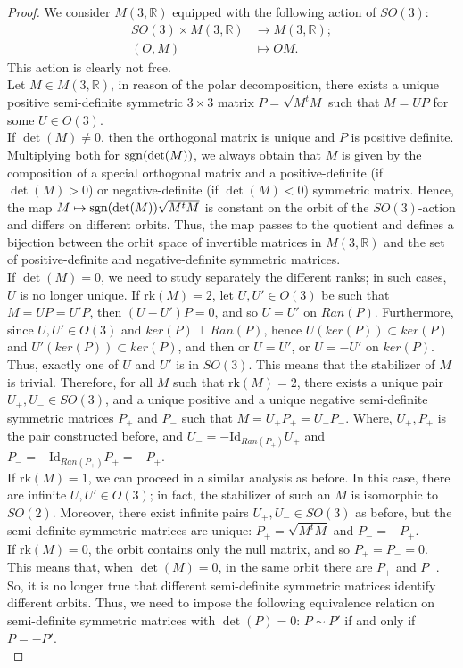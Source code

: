 \documentclass{article}
\numberwithin{equation}{section}
\theoremstyle{definition}
\newcommand{\R}{\mathbb{R}}
\begin{document}
\begin{proof}
    We consider $M(3,\R)$ equipped with the following action of $SO(3)$:
    \begin{align*}
        SO(3)\times M(3,\R)&\to M(3,\R);\\
        (O,M)&\mapsto OM.
    \end{align*}
    This action is clearly not free.\\
    Let $M\in M(3,\R)$, in reason of the polar decomposition, there exists a unique positive semi-definite symmetric $3\times 3$ matrix $P=\sqrt{M^tM}$ such that $M=UP$ for some $U\in O(3)$.\\
    If $\det(M)\neq 0$, then the orthogonal matrix is unique and $P$ is positive definite. Multiplying both for ${\rm sgn}(\det(M))$, we always obtain that $M$ is given by the composition of a special orthogonal matrix and a positive-definite (if $\det(M)>0$) or negative-definite (if $\det(M)<0$) symmetric matrix. Hence, the map $M\mapsto {\rm sgn}(\det(M))\sqrt{M^tM}$ is constant on the orbit of the $SO(3)$-action and differs on different orbits. Thus, the map passes to the quotient and defines a bijection between the orbit space of invertible matrices in $M(3,\R)$ and the set of positive-definite and negative-definite symmetric matrices.\\
    If $\det(M)=0$, we need to study separately the different ranks; in such cases, $U$ is no longer unique. If $\mathrm{rk}(M)=2$, let $U,U'\in O(3)$ be such that $M=UP=U'P$, then $(U-U')P=0$, and so $U=U'$ on $Ran(P)$. Furthermore, since $U,U'\in O(3)$ and $ker(P)\perp Ran(P)$, hence $U(ker(P))\subset ker(P)$ and $U'(ker(P))\subset ker(P)$, and then or $U= U'$, or $U=-U'$ on $ker(P)$. Thus, exactly one of $U$ and $U'$ is in $SO(3)$. This means that the stabilizer of $M$ is trivial. Therefore, for all $M$ such that $\mathrm{rk}(M)=2$, there exists a unique pair $U_+,U_-\in SO(3)$, and a unique positive and a unique negative semi-definite symmetric matrices $P_+$ and $P_-$ such that $M=U_+P_+=U_-P_-$. Where, $U_+,P_+$ is the pair constructed before, and $U_-=-\mathrm{Id}_{Ran(P_+)}U_+$ and $P_-=-\mathrm{Id}_{Ran(P_+)}P_+=-P_+$.\\
    If $\mathrm{rk}(M)=1$, we can proceed in a similar analysis as before. In this case, there are infinite $U,U'\in O(3)$; in fact, the stabilizer of such an $M$ is isomorphic to $SO(2)$. Moreover, there exist infinite pairs $U_+,U_-\in SO(3)$ as before, but the semi-definite symmetric matrices are unique: $P_+=\sqrt{M^tM}$ and $P_-=-P_+$.\\
    If $\mathrm{rk}(M)=0$, the orbit contains only the null matrix, and so $P_+=P_-=0$.\\
    This means that, when $\det(M)=0$, in the same orbit there are $P_+$ and $P_-$. So, it is no longer true that different semi-definite symmetric matrices identify different orbits. Thus, we need to impose the following equivalence relation on semi-definite symmetric matrices with $\det(P)=0$: $P\sim P'$ if and only if $P=-P'$.\\
\end{proof}
\end{document}
